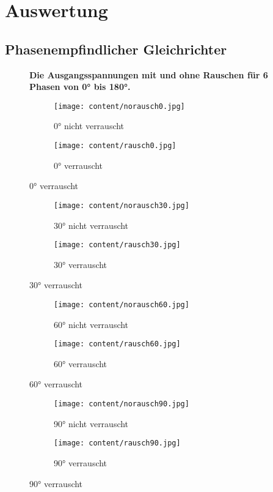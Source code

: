 \section{Auswertung}
\label{sec:Auswertung}
\subsection{Phasenempfindlicher Gleichrichter}
\begin{figure}[H]  
  \centering
  \textbf{Die Ausgangsspannungen mit und ohne Rauschen für 6 Phasen von 0° bis 180°.}\par\medskip
  \begin{subfigure}{0.48\textwidth}
    \centering
    \texttt{[image: content/norausch0.jpg]}
    \caption{0° nicht verrauscht}
    \label{subfig:norausch0}
  \end{subfigure}
  \hfill
  \begin{subfigure}{0.48\textwidth}
    \centering
    \texttt{[image: content/rausch0.jpg]}
    \caption{0° verrauscht}
    \label{subfig:rausch0}
  \end{subfigure}
\end{figure}
\begin{figure}[H]  
  \centering
  \begin{subfigure}{0.48\textwidth}
    \centering
    \texttt{[image: content/norausch30.jpg]}
    \caption{30° nicht verrauscht}
    \label{subfig:norausch30}
  \end{subfigure}
  \hfill
  \begin{subfigure}{0.48\textwidth}
    \centering
    \texttt{[image: content/rausch30.jpg]}
    \caption{30° verrauscht}
    \label{subfig:rausch30}
  \end{subfigure}
\end{figure}
\begin{figure}[H]  
  \centering
  \begin{subfigure}{0.48\textwidth}
    \centering
    \texttt{[image: content/norausch60.jpg]}
    \caption{60° nicht verrauscht}
    \label{subfig:norausch60}
  \end{subfigure}
  \hfill
  \begin{subfigure}{0.48\textwidth}
    \centering
    \texttt{[image: content/rausch60.jpg]}
    \caption{60° verrauscht}
    \label{subfig:rausch60}
  \end{subfigure}
\end{figure}
\begin{figure}[H]  
  \centering
  \begin{subfigure}{0.48\textwidth}
    \centering
    \texttt{[image: content/norausch90.jpg]}
    \caption{90° nicht verrauscht}
    \label{subfig:norausch90}
  \end{subfigure}
  \hfill
  \begin{subfigure}{0.48\textwidth}
    \centering
    \texttt{[image: content/rausch90.jpg]}
    \caption{90° verrauscht}
    \label{subfig:rausch90}
  \end{subfigure}
\end{figure}
